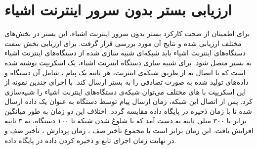 \newpage

\section{ارزیابی بستر بدون سرور اینترنت اشیاء}

برای اطمینان از صحت کارکرد بستر بدون سرور اینترنت اشیاء، این بستر در بخش‌های مختلف ارزیابی شده و نتایج آن مورد بررسی قرار گرفت. برای ارزیابی بخش سمت دستگاه‌های اینترنت اشیاء باید شبکه‌ای شبیه سازی شده از دستگاه‌های اینترنت اشیاء به بستر متصل شود. برای شبیه سازی دستگاه اینترنت اشیاء، یک اسکریپت نوشته شده است که با اتصال به  از طریق شبکه‌ی اینترنت، هر ثانیه یک پیام ، شامل  آن دستگاه و داده‌های تولید شده به صورت تصادفی را به بستر ارسال کند. با اجرای چندین نمونه از این اسکریپت با  های مختلف می‌توان شبکه‌ی دستگاه‌های اینترنت اشیاء را شبیه‌سازی کرد. پس از اتصال این شبکه، زمان ارسال پیام توسط دستگاه به عنوان یک داده ارسال شده تا با زمان ذخیره در پایگاه داده مقایسه گردد. اختلاف این دو زمان به طور میانگین برابر با ۳۰۰ میلی ثانیه به دست آمد که با شلوغ شدن شبکه تا ۱۰۰ دستگاه، به ۳ ثانیه افزایش یافت. این زمان برابر است با مجموع تأخیر صف ، زمان پردازش ، تأخیر صف  و در نهایت زمان اجرای تابع و ذخیره کردن داده در پایگاه داده.

